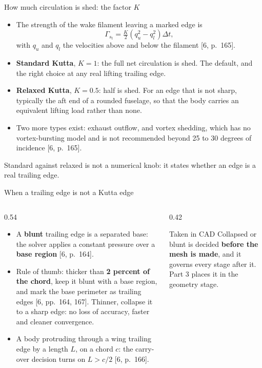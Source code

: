 \begin{frame}{How much circulation is shed: the factor \(K\)}
\begin{itemize}\small
  \item The strength of the wake filament leaving a marked edge is
        \[ \Gamma_{s_t} = \tfrac{K}{2}\left(q_u^{2} - q_l^{2}\right)\Delta t, \]
        with \(q_u\) and \(q_l\) the velocities above and below the filament
        [6, p.~165].
  \item \textbf{Standard Kutta}, \(K = 1\): the full net circulation is shed.
        The default, and the right choice at any real lifting trailing edge.
  \item \textbf{Relaxed Kutta}, \(K = 0.5\): half is shed. For an edge that is
        not sharp, typically the aft end of a rounded fuselage, so that the
        body carries an equivalent lifting load rather than none.
  \item Two more types exist: exhaust outflow, and vortex shedding, which has
        no vortex-bursting model and is not recommended beyond 25 to 30 degrees
        of incidence [6, p.~165].
\end{itemize}
\begin{takeaway}Standard against relaxed is not a numerical knob: it states
whether an edge is a real trailing edge.\end{takeaway}
\end{frame}

\begin{frame}{When a trailing edge is not a Kutta edge}
\begin{columns}[T]
\begin{column}{0.54\textwidth}
\begin{itemize}\small
  \item A \textbf{blunt} trailing edge is a separated base: the solver applies
        a constant pressure over a \textbf{base region} [6, p.~164].
  \item Rule of thumb: thicker than \textbf{2 percent of the chord}, keep it
        blunt with a base region, and mark the base perimeter as trailing
        edges [6, pp.~164, 167]. Thinner, collapse it to a sharp edge: no loss
        of accuracy, faster and cleaner convergence.
  \item A body protruding through a wing trailing edge by a length \(L\), on a
        chord \(c\): the carry-over decision turns on \(L > c/2\)
        [6, p.~166].
\end{itemize}
\end{column}
\begin{column}{0.42\textwidth}
\begin{block}{Taken in CAD}
\small Collapsed or blunt is decided \textbf{before the mesh is made}, and it
governs every stage after it. Part 3 places it in the geometry stage.
\end{block}
\end{column}
\end{columns}
\end{frame}

